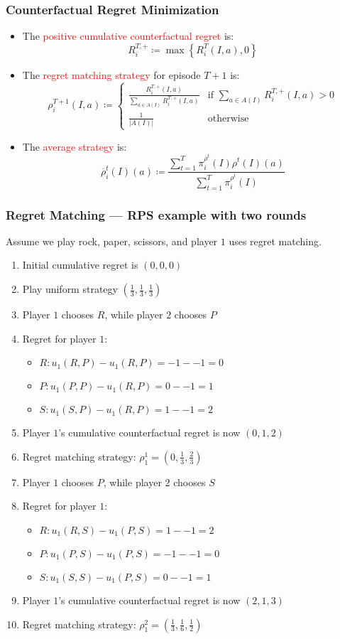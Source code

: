 \documentclass[UTF8,11pt,colorlinks,compress,openany]{beamer}%
\begin{document}
\begin{frame}\frametitle{Counterfactual Regret Minimization}
\begin{itemize}
	\item The \textcolor{red}{positive cumulative counterfactual regret} is:
	\[R_i^{T,+}\coloneqq \max\left\{R_i^T(I,a),0\right\}\]
	\item The \textcolor{red}{regret matching strategy} for episode $T + 1$ is:
	\[\rho_i^{T+1}(I,a)\coloneqq
	\begin{cases}
		\frac{R_i^{T,+}(I,a)}{\sum\limits_{a\in A(I)}R_i^{T,+}(I,a)} &\mbox{if } \sum\limits_{a\in A(I)}R_i^{T,+}(I,a)>0\\
		\frac{1}{|A(I)|} &\mbox{otherwise}
	\end{cases}\]
	\item The \textcolor{red}{average strategy} is:
	\[\overline{\rho}_i^t(I)(a)\coloneqq\frac{\sum\limits_{t=1}^T\pi_i^{\rho^t}(I)\rho^t(I)(a)}{\sum\limits_{t=1}^T\pi_i^{\rho^t}(I)}\]
\end{itemize}
\end{frame}

\begin{frame}\frametitle{Regret Matching --- RPS example with two rounds}
Assume we play rock, paper, scissors, and player $1$ uses
regret matching.
\begin{enumerate}
	\item Initial cumulative regret is $(0,0,0)$
	\item Play uniform strategy $(\frac{1}{3},\frac{1}{3},\frac{1}{3})$
	\item Player $1$ chooses $R$, while player $2$ chooses $P$
	\item Regret for player $1$:
	\begin{itemize}
		\item $R: u_1(R,P)-u_1(R,P)=-1--1=0$
		\item $P: u_1(P,P)-u_1(R,P)=0--1=1$
		\item $S: u_1(S,P)-u_1(R,P)=1--1=2$
	\end{itemize}
	\item Player $1$'s cumulative counterfactual regret is now $(0,1,2)$
	\item Regret matching strategy: $\rho_1^1=(0,\frac{1}{3},\frac{2}{3})$
	\item Player $1$ chooses $P$, while player $2$ chooses $S$
	\item Regret for player $1$:
	\begin{itemize}
		\item $R: u_1(R,S)-u_1(P,S)=1--1=2$
		\item $P: u_1(P,S)-u_1(P,S)=-1--1=0$
		\item $S: u_1(S,S)-u_1(P,S)=0--1=1$
	\end{itemize}
	\item Player $1$'s cumulative counterfactual regret is now $(2,1,3)$
	\item Regret matching strategy: $\rho_1^2=(\frac{1}{3},\frac{1}{6},\frac{1}{2})$
\end{enumerate}
\end{frame}
\end{document}

